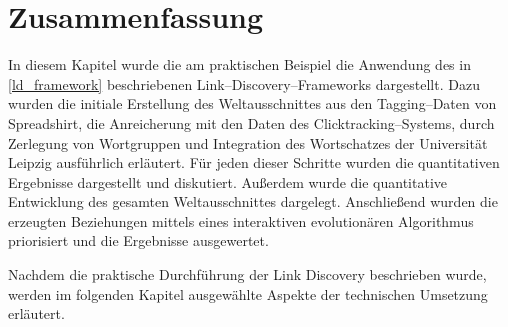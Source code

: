 \cleardoublepage

\section{Zusammenfassung}

In diesem Kapitel wurde die am praktischen Beispiel die Anwendung des in \cref{ld_framework} beschriebenen Link--Discovery--Frameworks dargestellt. Dazu wurden die initiale Erstellung des Weltausschnittes aus den Tagging--Daten von Spreadshirt, die Anreicherung mit den Daten des Clicktracking--Systems, durch Zerlegung von Wortgruppen und Integration des Wortschatzes der Universität Leipzig ausführlich erläutert. Für jeden dieser Schritte wurden die quantitativen Ergebnisse dargestellt und diskutiert. Außerdem wurde die quantitative Entwicklung des gesamten Weltausschnittes dargelegt. Anschließend wurden die erzeugten Beziehungen mittels eines interaktiven evolutionären Algorithmus priorisiert und die Ergebnisse ausgewertet.

Nachdem die praktische Durchführung der Link Discovery beschrieben wurde, werden im folgenden Kapitel ausgewählte Aspekte der technischen Umsetzung erläutert.